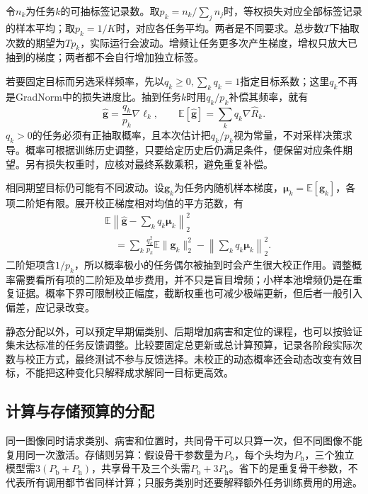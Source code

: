 令$n_k$为任务$k$的可抽标签记录数。取$p_k=n_k/\sum_jn_j$时，等权损失对应全部标签记录的样本平均；取$p_k=1/K$时，对应各任务平均。两者是不同要求。总步数$T$下抽取次数的期望为$Tp_k$，实际运行会波动。增频让任务更多次产生梯度，增权只放大已抽到的梯度；两者都不会自行增加独立标签。

若要固定目标而另选采样频率，先以$q_k\geq0,\sum_kq_k=1$指定目标系数；这里$q_k$不再是GradNorm中的损失进度比。抽到任务$k$时用$q_k/p_k$补偿其频率，就有
\begin{equation}
  \widehat{\bm g}
  =\frac{q_k}{p_k}\nabla\ell_k,
  \qquad
  \mathbb E[\widehat{\bm g}]
  =\sum_kq_k\nabla\hat R_k.
  \label{eq:ket-sharing-importance-sampling}
\end{equation}
$q_k>0$的任务必须有正抽取概率，且本次估计把$q_k/p_k$视为常量，不对采样决策求导。概率可根据训练历史调整，只要给定历史后仍满足条件，便保留对应条件期望。另有损失权重时，应核对最终系数乘积，避免重复补偿。

相同期望目标仍可能有不同波动。设$\bm g_k$为任务内随机样本梯度，$\bm\mu_k=\mathbb E[\bm g_k]$，各项二阶矩有限。展开校正梯度相对均值的平方范数，有
\begin{align}
  &\mathbb E\left\|
    \widehat{\bm g}-\sum_kq_k\bm\mu_k
  \right\|_2^2
  \nonumber\\
  &\quad=
  \sum_k\frac{q_k^2}{p_k}\mathbb E\|\bm g_k\|_2^2
  -\left\|\sum_kq_k\bm\mu_k\right\|_2^2.
  \label{eq:ket-sharing-sampling-variance}
\end{align}
二阶矩项含$1/p_k$，所以概率极小的任务偶尔被抽到时会产生很大校正作用。调整概率需要看所有项的二阶矩及单步费用，并不只是盲目增频；小样本池增频仍是在重复证据。概率下界可限制校正幅度，截断权重也可减少极端更新，但后者一般引入偏差，应记录改变。

静态分配以外，可以预定早期偏类别、后期增加病害和定位的课程，也可以按验证集未达标准的任务反馈调整。比较要固定总更新或总计算预算，记录各阶段实际次数与校正方式，最终测试不参与反馈选择。未校正的动态概率还会动态改变有效目标，不能把这种变化只解释成求解同一目标更高效。

\subsection{计算与存储预算的分配}
\label{sec:ket-sharing-budget}

同一图像同时请求类别、病害和位置时，共同骨干可以只算一次，但不同图像不能复用同一次激活。存储则另算：假设骨干参数量为$P_{\mathrm b}$，每个头均为$P_{\mathrm h}$，三个独立模型需$3(P_{\mathrm b}+P_{\mathrm h})$，共享骨干及三个头需$P_{\mathrm b}+3P_{\mathrm h}$。省下的是重复骨干参数，不代表所有调用都节省同样计算；只服务类别时还要解释额外任务训练费用的用途。

